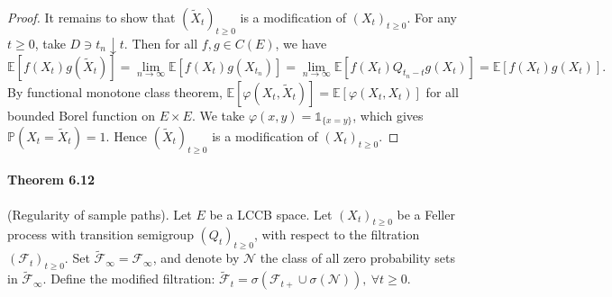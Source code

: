 \documentclass{article}
\numberwithin{equation}{section}
\newcommand{\E}{\mathbb{E}}
\renewcommand{\P}{\mathbb{P}}
\theoremstyle{plain}
\theoremstyle{definition}
\begin{document}
\begin{proof}
It remains to show that $(\widetilde{X}_t)_{t\geq 0}$ is a modification of $(X_t)_{t\geq 0}$. For any $t\geq 0$, take $D\ni t_n\downarrow t$. Then for all $f,g\in C(E)$, we have $$\E[f(X_t)g(\widetilde{X}_t)]=\lim_{n\to\infty}\E[f(X_t)g(X_{t_n})]=\lim_{n\to\infty}\E[f(X_t)Q_{t_n-t}g(X_t)]=\E[f(X_t)g(X_t)].$$
By functional monotone class theorem, $\E[\varphi(X_t,\widetilde{X}_t)]=\E[\varphi(X_t,X_t)]$ for all bounded Borel function on $E\times E$. We take $\varphi(x,y)=\mathds{1}_{\{x=y\}}$, which gives $\P(X_t=\widetilde{X}_t)=1$. Hence $(\widetilde{X}_t)_{t\geq 0}$ is a modification of $(X_t)_{t\geq 0}$.
\end{proof}

\paragraph{Theorem 6.12\label{thm:6.12}} (Regularity of sample paths). Let $E$ be a LCCB space. Let $(X_t)_{t\geq 0}$ be a Feller process with transition semigroup $(Q_t)_{t\geq 0}$, with respect to the filtration $(\mathscr{F}_t)_{t\geq 0}$. Set $\widetilde{\mathscr{F}}_\infty=\mathscr{F}_\infty$, and denote by $\mathscr{N}$ the class of all zero probability sets in $\widetilde{\mathscr{F}}_\infty$. Define the modified filtration: $\widetilde{\mathscr{F}}_t=\sigma\left(\mathscr{F}_{t+}\cup\sigma(\mathscr{N})\right),\ \forall t\geq 0$.
\end{document}
